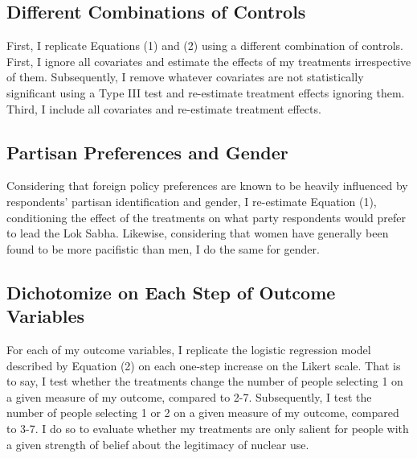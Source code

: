 \documentclass[12pt]{article}
\begin{document}
\subsection{Different Combinations of Controls}
First, I replicate Equations (1) and (2) using a different combination of controls. First, I ignore all covariates and estimate the effects of my treatments irrespective of them. Subsequently, I remove whatever covariates are not statistically significant using a Type III test and re-estimate treatment effects ignoring them. Third, I include all covariates and re-estimate treatment effects.

\subsection{Partisan Preferences and Gender}
Considering that foreign policy preferences are known to be heavily influenced by respondents' partisan identification and gender, I re-estimate Equation (1), conditioning the effect of the treatments on what party respondents would prefer to lead the Lok Sabha. Likewise, considering that women have generally been found to be more pacifistic than men, I do the same for gender.

\subsection{Dichotomize on Each Step of Outcome Variables}
For each of my outcome variables, I replicate the logistic regression model described by Equation (2) on each one-step increase on the Likert scale. That is to say, I test whether the treatments change the number of people selecting 1 on a given measure of my outcome, compared to 2-7. Subsequently, I test the number of people selecting 1 or 2 on a given measure of my outcome, compared to 3-7. I do so to evaluate whether my treatments are only salient for people with a given strength of belief about the legitimacy of nuclear use.


\end{document}
